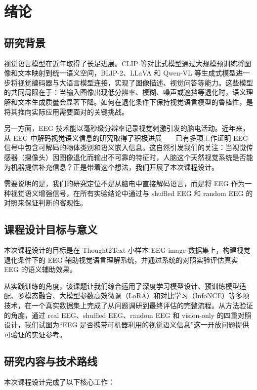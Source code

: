 \section{绪论}

\subsection{研究背景}

视觉语言模型在近年取得了长足进展。CLIP 等对比式模型通过大规模预训练将图像和文本映射到统一语义空间，BLIP-2、LLaVA 和 Qwen-VL 等生成式模型进一步将视觉编码器与大语言模型连接，实现了图像描述、视觉问答等能力。这些模型的共同局限在于：当输入图像出现低分辨率、模糊、噪声或遮挡等退化时，语义理解和文本生成质量会显著下降。如何在退化条件下保持视觉语言模型的鲁棒性，是将其推向实际应用需要面对的关键挑战。

另一方面，EEG 技术能以毫秒级分辨率记录视觉刺激引发的脑电活动。近年来，从 EEG 中解码视觉语义信息的研究取得了积极进展——已有多项工作证明 EEG 信号中包含可解码的物体类别和语义嵌入信息。这自然引发我们的关注：当视觉传感器（摄像头）因图像退化而输出不可靠的特征时，人脑这个天然视觉系统是否能为机器提供补充信息？正是带着这个想法，我们开展了本次课程设计。

需要说明的是，我们的研究定位不是从脑电中直接解码语言，而是将 EEG 作为一种视觉语义增强信号，在所有实验结论中通过与 shuffled EEG 和 random EEG 的对照来保证判断的客观性。

\subsection{课程设计目标与意义}

本次课程设计的目标是在 Thought2Text 小样本 EEG-image 数据集上，构建视觉退化条件下的 EEG 辅助视觉语言理解系统，并通过系统的对照实验评估真实 EEG 的语义辅助效果。

从实践训练的角度，该课题让我们综合运用了深度学习模型设计、预训练模型适配、多模态融合、大模型参数高效微调（LoRA）和对比学习（InfoNCE）等多项技术，在一个真实数据集上完成了从问题调研到最终评估的完整流程。从方法验证的角度，通过 real EEG、shuffled EEG、random EEG 和 vision-only 的四重对照设计，我们试图为``EEG 是否携带可机器利用的视觉语义信息''这一开放问题提供可验证的实证参考。

\subsection{研究内容与技术路线}

本次课程设计完成了以下核心工作：

